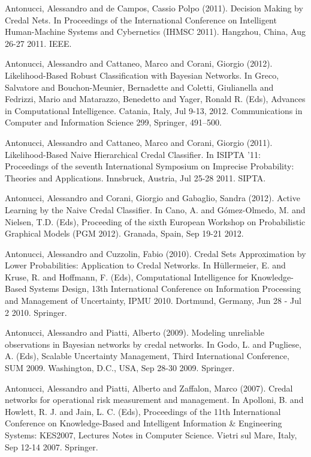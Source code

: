 \begin{cventries}
\begin{cvitems}
\item Antonucci, Alessandro and de Campos, Cassio Polpo (2011).   Decision Making by Credal Nets.   In Proceedings of the International Conference on Intelligent Human-Machine Systems and Cybernetics (IHMSC 2011).   Hangzhou, China,   Aug 26-27 2011.   IEEE.
\item Antonucci, Alessandro and Cattaneo, Marco and Corani, Giorgio (2012).   Likelihood-Based Robust Classification with Bayesian Networks.   In Greco, Salvatore and Bouchon-Meunier, Bernadette and Coletti, Giulianella and Fedrizzi, Mario and Matarazzo, Benedetto and Yager, Ronald R. (Eds), Advances in Computational Intelligence.   Catania, Italy, Jul 9-13, 2012.   Communications in Computer and Information Science 299, Springer, 491–500.
\item Antonucci, Alessandro and Cattaneo, Marco and Corani, Giorgio (2011).   Likelihood-Based Naive Hierarchical Credal Classifier.   In ISIPTA ’11: Proceedings of the seventh International Symposium on Imprecise Probability: Theories and Applications.   Innsbruck, Austria,   Jul 25-28 2011.   SIPTA.
\item Antonucci, Alessandro and Corani, Giorgio and Gabaglio, Sandra (2012).   Active Learning by the Naive Credal Classifier.   In Cano, A. and Gómez-Olmedo, M. and Nielsen, T.D. (Eds), Proceeding of the sixth European Workshop on Probabilistic Graphical Models (PGM 2012).   Granada, Spain,   Sep 19-21 2012.
\item Antonucci, Alessandro and Cuzzolin, Fabio (2010).   Credal Sets Approximation by Lower Probabilities: Application to Credal Networks.   In Hüllermeier, E. and Kruse, R. and Hoffmann, F. (Eds), Computational Intelligence for Knowledge-Based Systems Design, 13th International Conference on Information Processing and Management of Uncertainty, IPMU 2010.   Dortmund, Germany,   Jun 28 - Jul 2 2010.   Springer.
\item Antonucci, Alessandro and Piatti, Alberto (2009).   Modeling unreliable observations in Bayesian networks by credal networks.   In Godo, L. and Pugliese, A. (Eds), Scalable Uncertainty Management, Third International Conference, SUM 2009.   Washington, D.C., USA,   Sep 28-30 2009.   Springer.
\item Antonucci, Alessandro and Piatti, Alberto and Zaffalon, Marco (2007).   Credal networks for operational risk measurement and management.   In Apolloni, B. and Howlett, R. J. and Jain, L. C. (Eds), Proceedings of the 11th International Conference on Knowledge-Based and Intelligent Information \& Engineering Systems: KES2007, Lectures Notes in Computer Science.   Vietri sul Mare, Italy,   Sep 12-14 2007.   Springer.

\end{cvitems}
\end{cventries}
